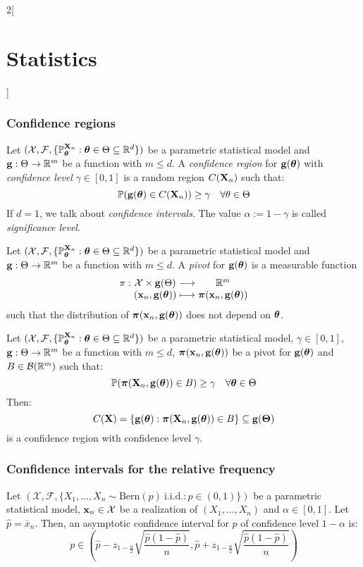\documentclass[../../../main_math.tex]{subfiles}
\begin{document}
\begin{multicols}{2}[\section{Statistics}]
  \subsubsection{Confidence regions}
  \begin{definition}
    Let $(\mathcal{X},\mathcal{F},\{\mathbb{P}_{\boldsymbol{\mathrm{\theta}}}^{\boldsymbol{\mathrm{X}}_n}:\boldsymbol{\mathrm{\theta}}\in\Theta\subseteq\mathbb{R}^d\})$ be a parametric statistical model and $\boldsymbol{\mathrm{g}}:\Theta\rightarrow\mathbb{R}^m$ be a function with $m\leq d$. A \emph{confidence region} for $\boldsymbol{\mathrm{g}}(\boldsymbol{\mathrm{\theta}})$ with \emph{confidence level} $\gamma\in[0,1]$ is a random region $C(\boldsymbol{\mathrm{X}}_n)$ such that: $$\mathbb{P}(\boldsymbol{\mathrm{g}}(\boldsymbol{\mathrm{\theta}})\in C(\boldsymbol{\mathrm{X}}_n))\geq \gamma\quad\forall \theta\in\Theta$$ If $d=1$, we talk about \emph{confidence intervals}. The value $\alpha:=1-\gamma$ is called \emph{significance level}.
  \end{definition}
  \begin{definition}
    Let $(\mathcal{X},\mathcal{F},\{\mathbb{P}_{\boldsymbol{\mathrm{\theta}}}^{\boldsymbol{\mathrm{X}}_n}:\boldsymbol{\mathrm{\theta}}\in\Theta\subseteq\mathbb{R}^d\})$ be a parametric statistical model and $\boldsymbol{\mathrm{g}}:\Theta\rightarrow\mathbb{R}^m$ be a function with $m\leq d$. A \emph{pivot} for $\boldsymbol{\mathrm{g}}(\boldsymbol{\mathrm{\theta}})$ is a measurable function
    $$\function{\pi}{\mathcal{X}\times \vf{g}(\Theta)}{\RR^m}{(\vf{x}_n,\vf{g}(\vf\theta))}{\vf\pi(\vf{x}_n,\vf{g}(\vf\theta))}$$
    such that the distribution of $\boldsymbol{\mathrm{\pi}}(\boldsymbol{\mathrm{x}}_n,\boldsymbol{\mathrm{g}}(\boldsymbol{\mathrm{\theta}}))$ does not depend on $\boldsymbol{\mathrm{\theta}}$.
  \end{definition}
  \begin{proposition}
    Let $(\mathcal{X},\mathcal{F},\{\mathbb{P}_{\boldsymbol{\mathrm{\theta}}}^{\boldsymbol{\mathrm{X}}_n}:\boldsymbol{\mathrm{\theta}}\in\Theta\subseteq\mathbb{R}^d\})$ be a parametric statistical model, $\gamma\in[0,1]$, $\boldsymbol{\mathrm{g}}:\Theta\rightarrow\mathbb{R}^m$ be a function with $m\leq d$, $\boldsymbol{\mathrm{\pi}}(\boldsymbol{\mathrm{x}}_n,\boldsymbol{\mathrm{g}}(\boldsymbol{\mathrm{\theta}}))$ be a pivot for $\boldsymbol{\mathrm{g}}(\boldsymbol{\mathrm{\theta}})$ and $B\in\mathcal{B}(\mathbb{R}^m)$ such that: $$\mathbb{P}(\boldsymbol{\mathrm{\pi}}(\boldsymbol{\mathrm{X}}_n,\boldsymbol{\mathrm{g}}(\boldsymbol{\mathrm{\theta}}))\in B)\geq \gamma\quad\forall \boldsymbol{\mathrm{\theta}}\in\Theta$$
    Then: $$C(\boldsymbol{\mathrm{X}})=\{\boldsymbol{\mathrm{g}}(\boldsymbol{\mathrm{\theta}}):\boldsymbol{\mathrm{\pi}}(\boldsymbol{\mathrm{X}}_n,\boldsymbol{\mathrm{g}}(\boldsymbol{\mathrm{\theta}}))\in B\}\subseteq \boldsymbol{\mathrm{g}}(\boldsymbol{\mathrm{\Theta}})$$
    is a confidence region with confidence level $\gamma$.
  \end{proposition}
  \subsubsection{Confidence intervals for the relative frequency}
  \begin{proposition}
    Let $(\mathcal{X},\mathcal{F},\{X_1,\ldots,X_n\sim\text{Bern}(p)\ \text{i.i.d.}:p\in(0,1)\})$ be a parametric statistical model, $\boldsymbol{\mathrm{x}}_n\in\mathcal{X}$ be a realization of $(X_1,\ldots,X_n)$ and $\alpha\in[0,1]$. Let $\hat{p}=\overline{x}_n$. Then, an asymptotic confidence interval for $p$ of confidence level $1-\alpha$ is:
    $$p\in\left(\hat{p}-z_{1-\frac{\alpha}{2}}\sqrt{\frac{\hat{p}(1-\hat{p})}{n}},\hat{p}+z_{1-\frac{\alpha}{2}}\sqrt{\frac{\hat{p}(1-\hat{p})}{n}}\right)$$
  \end{proposition}

\end{multicols}
\end{document}
